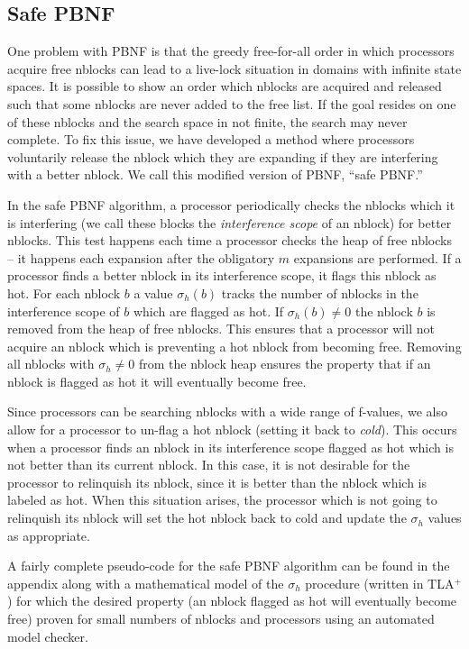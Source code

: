 \documentclass{article}
\begin{document}
\subsection{Safe PBNF}

One problem with PBNF is that the greedy free-for-all order in which
processors acquire free nblocks can lead to a live-lock situation in
domains with infinite state spaces.  It is possible to show an order
which nblocks are acquired and released such that some nblocks are
never added to the free list.  If the goal resides on one of these
nblocks and the search space in not finite, the search may never
complete.  To fix this issue, we have developed a method where
processors voluntarily release the nblock which they are expanding if
they are interfering with a better nblock.  We call this modified
version of PBNF, ``safe PBNF.''

In the safe PBNF algorithm, a processor periodically checks the
nblocks which it is interfering (we call these blocks the
\emph{interference scope} of an nblock) for better nblocks.  This test
happens each time a processor checks the heap of free nblocks -- it
happens each expansion after the obligatory $m$ expansions are
performed.  If a processor finds a better nblock in its interference
scope, it flags this nblock as hot.  For each nblock $b$ a value
$\sigma_h(b)$ tracks the number of nblocks in the interference scope
of $b$ which are flagged as hot.  If $\sigma_h(b) \neq 0$ the nblock
$b$ is removed from the heap of free nblocks.  This ensures that a
processor will not acquire an nblock which is preventing a hot nblock
from becoming free.  Removing all nblocks with $\sigma_h \neq 0$ from
the nblock heap ensures the property that if an nblock is flagged as
hot it will eventually become free.

Since processors can be searching nblocks with a wide range of
f-values, we also allow for a processor to un-flag a hot nblock
(setting it back to \emph{cold}).  This occurs when a processor finds
an nblock in its interference scope flagged as hot which is not better
than its current nblock.  In this case, it is not desirable for the
processor to relinquish its nblock, since it is better than the nblock
which is labeled as hot.  When this situation arises, the processor
which is not going to relinquish its nblock will set the hot nblock
back to cold and update the $\sigma_h$ values as appropriate.

A fairly complete pseudo-code for the safe PBNF algorithm can be found
in the appendix along with a mathematical model of the $\sigma_h$
procedure (written in TLA$^+$) for which the desired property (an
nblock flagged as hot will eventually become free) proven for small
numbers of nblocks and processors using an automated model checker.
\end{document}
